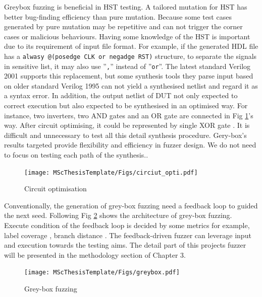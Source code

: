 Greybox fuzzing is beneficial in HST testing. A tailored mutation for HST has better bug-finding efficiency than pure mutation.  Because some test cases generated by pure mutation may be repetitive and can not trigger the corner cases or malicious behaviours.  Having some knowledge of the HST is important due to its requirement of input file format. For example, if the generated HDL file has a \texttt{alwasy @(posedge CLK or negadge RST)} structure, to separate the signals in sensitive list, it may also use ''\texttt{,}'' instead of ''\texttt{or}''. The latest standard Verilog 2001 \cite{ieee2001} supports this replacement, but some synthesis tools they parse input based on older standard Verilog 1995 can not yield a synthesised netlist and regard it as a syntax error. In addition, the output netlist of DUT not only expected to correct execution but also expected to be synthesised in an optimised way. For instance, two inverters, two AND gates and an OR gate are connected in Fig \ref{fig:circuitoptim}'s way. After circuit optimising, it could be represented by single XOR gate \cite{mano2015logic}. It is difficult and unnecessary to test all this detail synthesis procedure. Gery-box's results targeted provide flexibility and efficiency in fuzzer design. We do not need to focus on testing each path of the synthesis..
\begin{figure}[htbp]
    \centering
    \texttt{[image: MScThesisTemplate/Figs/circiut\_opti.pdf]}
    \caption{\footnotesize Circuit optimisation}
    \label{fig:circuitoptim}
\end{figure}
Conventionally, the generation of grey-box fuzzing need a feedback loop to guided the next seed. Following Fig \ref{fig:gerybox} shows the architecture of grey-box fuzzing. Execute condition of the feedback loop is decided by some metrics for example, label coverage \cite{havrikov2017sym,havrikov2017efficient}, branch distance \cite{havrikov2017efficient}. The feedback-driven fuzzer can leverage input and execution towards the testing aims. The detail part of this projects fuzzer will be presented in the methodology section of Chapter 3.
\begin{figure}[htbp]
    \centering
    \texttt{[image: MScThesisTemplate/Figs/greybox.pdf]}
    \caption{\footnotesize Grey-box fuzzing}
    \label{fig:gerybox}
\end{figure}
